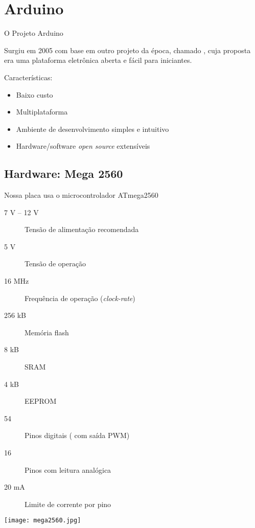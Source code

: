 \section{Arduino}


\begin{frame}{O Projeto Arduino}

	Surgiu em 2005 com base em outro projeto da época, chamado , cuja proposta era uma plataforma eletrônica aberta e fácil para iniciantes.

	\medskip
	Características:
	\begin{itemize}
		\item Baixo custo
		\item Multiplataforma
		\item Ambiente de desenvolvimento simples e intuitivo
		\item Hardware/software \textit{open source} extensíveis
	\end{itemize}

\end{frame}


\subsection{Hardware: Mega 2560}


\begin{frame}{\insertsubsection}

	Nossa placa usa o microcontrolador \textcolor{ArduinoTeal}{ATmega2560}
	\begin{description}
		\item[7 V -- 12 V] Tensão de alimentação recomendada
		\item[5 V] Tensão de operação
		\item[16 MHz] Frequência de operação (\textit{clock-rate})
		\item[256 kB] Memória flash
		\item[8 kB] SRAM
		\item[4 kB] EEPROM
		\item[54] Pinos digitais ( com saída PWM)
		\item[16] Pinos com leitura analógica
		\item[20 mA] Limite de corrente por pino
	\end{description}

\end{frame}


{ 
\begin{frame}{\insertsubsection}

	\texttt{[image: mega2560.jpg]}

\end{frame}
}


